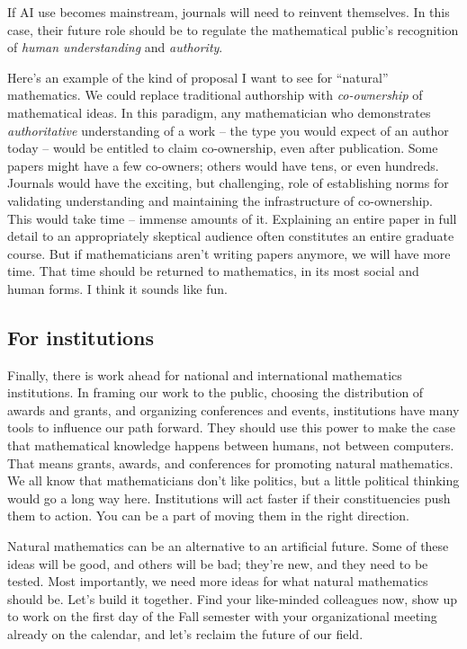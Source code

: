 \documentclass[12pt]{amsart}
\theoremstyle{definition}
\begin{document}
If AI use becomes mainstream, journals will need to reinvent themselves. In this case, their future role should be to regulate the mathematical public’s recognition of \emph{human understanding} and \emph{authority}.

Here's an example of the kind of proposal I want to see for ``natural'' mathematics. We could replace traditional authorship with \emph{co-ownership} of mathematical ideas. In this paradigm, any mathematician who demonstrates \emph{authoritative} understanding of a work – the type you would expect of an author today – would be entitled to claim co-ownership, even after publication. Some papers might have a few co-owners; others would have tens, or even hundreds. Journals would have the exciting, but challenging, role of establishing norms for validating understanding and maintaining the infrastructure of co-ownership. This would take time – immense amounts of it. Explaining an entire paper in full detail to an appropriately skeptical audience often constitutes an entire graduate course. But if mathematicians aren’t writing papers anymore, we will have more time. That time should be returned to mathematics, in its most social and human forms. I think it sounds like fun. 

\subsection*{For institutions}
Finally, there is work ahead for national and international mathematics institutions. In framing our work to the public, choosing the distribution of awards and grants, and organizing conferences and events, institutions have many tools to influence our path forward. They should use this power to make the case that mathematical knowledge happens between humans, not between computers. That means grants, awards, and conferences for promoting natural mathematics. We all know that mathematicians don't like politics, but a little political thinking would go a long way here. Institutions will act faster if their constituencies push them to action. You can be a part of moving them in the right direction. 

Natural mathematics can be an alternative to an artificial future. 
Some of these ideas will be good, and others will be bad; they’re new, and they need to be tested. Most importantly, we need more ideas for what natural mathematics should be. Let's build it together. Find your like-minded colleagues now, show up to work on the first day of the Fall semester with your organizational meeting already on the calendar, and let’s reclaim the future of our field.



\end{document}
